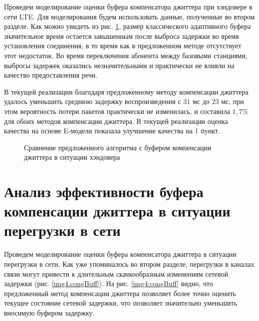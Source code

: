 Проведем моделирование оценки буфера компенсатора джиттера при хэндовере в сети LTE. 
Для моделирования будем использовать данные, полученные во втором разделе. 
Как можно увидеть из рис. \ref{img4:handBuff}, размер классического адаптивного буфера значительное время остается завышенным после выброса задержки во время установления соединения, в то время как в предложенном методе отсутствует этот недостаток.
Во время переключения абонента между базовыми станциями, выбросы задержек оказались незначительными и практически не влияли на качество предоставления речи.


В текущей реализации благодаря предложенному методу компенсации джиттера удалось уменьшить среднюю задержку воспроизведения с $31$ мс до $23$ мс, при этом вероятность потери пакетов практически не изменилась, и составила $1{,}7\%$ для обоих методов компенсации джиттера.
В текущей реализации оценка качества на основе E-модели показала улучшение качества на 1 пункт.


\pgfplotsset{width=15cm, height=10cm, compat=1.3}
\begin{figure} [!ht]
  \center
{}
\caption{Сравнение предложенного алгоритма с буфером компенсации джиттера \cite{Ramjee} в ситуации хэндовера}
  \label{img4:handBuff}
\end{figure}


\section{Анализ эффективности буфера компенсации джиттера в ситуации перегрузки в сети} \label{sect4}

Проведем моделирование оценки буфера компенсатора джиттера в ситуации перегрузки в сети. 
Как уже упоминалось во втором разделе, перегрузки в каналах связи могут привести к длительным скачкообразным изменениям сетевой задержки (рис. \ref{img4:congBuff}).
На рис. \ref{img4:congBuff} видно, что предложенный метод компенсации джиттера позволяет более точно оценить текущее состояние сетевой задержки, что позволяет значительно уменьшить вносимую буфером задержку.

